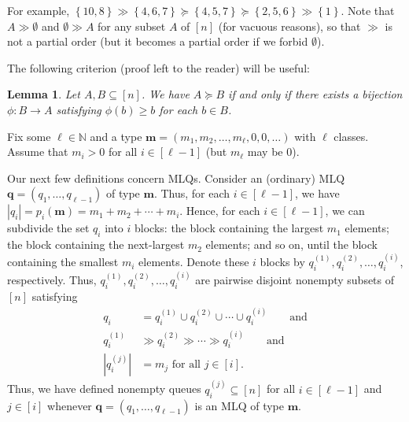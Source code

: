 \documentclass[reqno]{amsart}
\newcommand{\0}{\phantom{c}}
\newcommand{\mm}{\mathbf{m}}
\newcommand{\qq}{\mathbf{q}}
\newcommand{\NN}{\mathbb{N}}
\newcommand{\set}[1]{\left\{ #1 \right\}}
\newcommand{\abs}[1]{\left| #1 \right|}
\newcommand{\tup}[1]{\left( #1 \right)}
\newcommand{\ive}[1]{\left[ #1 \right]}
\theoremstyle{plain}
\newtheorem{lemma}[thm]{Lemma}
\theoremstyle{definition}
\numberwithin{equation}{section}
\newcommand{\darij}[1]{\todo[size=\tiny,color=red!30]{#1 \\ \hfill --- Darij}}
\newcommand{\travis}[1]{\todo[size=\tiny,color=blue!30]{#1 \\ \hfill --- Travis}}
\begin{document}
For example, $\set{10,8} \gg \set{4,6,7} \succeq \set{4,5,7} \succeq \set{2,5,6}  \gg \set{1}$.
Note that $A \gg \emptyset$ and $\emptyset \gg A$ for any subset $A$ of $\ive{n}$ (for vacuous reasons), so that $\gg$ is not a partial order (but it becomes a partial order if we forbid $\emptyset$).

The following criterion (proof left to the reader) will be useful:

\begin{lemma}
\label{lem:determinant_form.gale1}
Let $A, B \subseteq \ive{n}$.
We have $A \succeq B$ if and only if there exists a bijection $\phi \colon B \to A$ satisfying $\phi(b) \geq b$ for each $b \in B$.
\end{lemma}

Fix some $\ell \in \NN$ and a type $\mm = \tup{m_1,m_2, \dotsc, m_{\ell}, 0, 0, \ldots}$ with $\ell$ classes.
Assume that $m_i > 0$ for all $i \in \ive{\ell-1}$ (but $m_{\ell}$ may be $0$).

Our next few definitions concern MLQs.
Consider an (ordinary) MLQ $\qq = \tup{q_1,\ldots,q_{\ell-1}}$ of type $\mm$.
Thus, for each $i \in \ive{\ell-1}$, we have $\abs{q_i} = p_i(\mm) = m_1 + m_2 + \cdots + m_i$.
Hence, for each $i \in \ive{\ell-1}$, we can subdivide the set $q_i$ into $i$ blocks: the block containing the largest $m_1$ elements; the block containing the next-largest $m_2$ elements; and so on, until the block containing the smallest $m_i$ elements.
Denote these $i$ blocks by $q_i^{(1)}, q_i^{(2)}, \dotsc, q_i^{(i)}$, respectively.
Thus, $q_i^{(1)}, q_i^{(2)}, \dotsc, q_i^{(i)}$ are pairwise disjoint nonempty subsets of $\ive{n}$ satisfying
\begin{subequations}
\begin{align}
\label{eq.determinant_form.qij.1}
  q_i  & = q_i^{(1)} \cup q_i^{(2)} \cup \cdots \cup q_i^{(i)}
\qquad \text{and}
\\ \label{eq.determinant_form.qij.2}
  q_i^{(1)} & \gg q_i^{(2)} \gg \cdots \gg q_i^{(i)}
\qquad \text{and}
\\ \label{eq.determinant_form.qij.3}
  \abs{q_i^{(j)}} & = m_j \text{ for all } j \in \ive{i}.
\end{align}
\end{subequations}
Thus, we have defined nonempty queues $q_i^{(j)} \subseteq \ive{n}$ for all $i \in \ive{\ell-1}$ and $j \in \ive{i}$ whenever $\qq = \tup{q_1, \dotsc, q_{\ell-1}}$ is an MLQ of type $\mm$.
\end{document}
